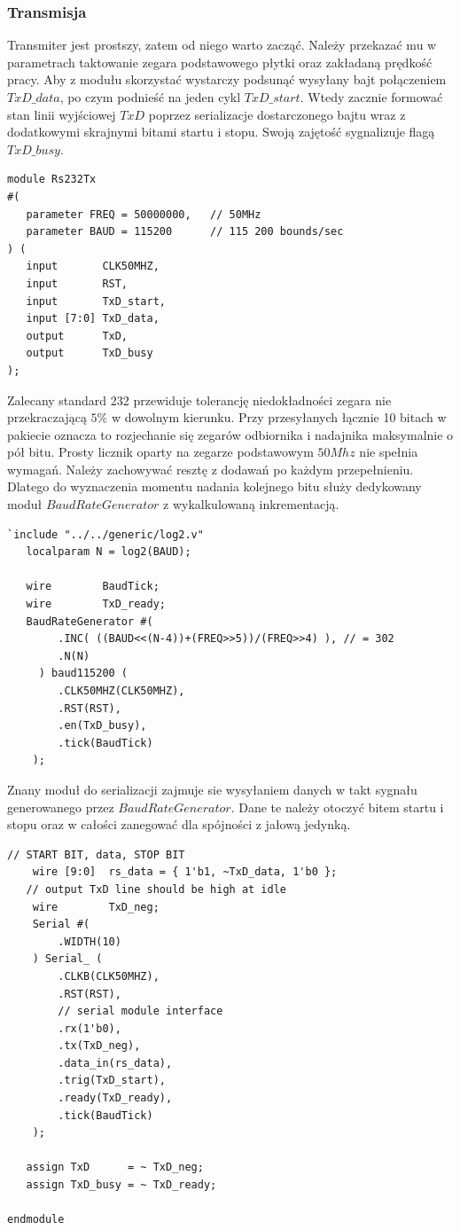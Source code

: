 \documentclass[a4paper,12pt]{article}
\begin{document}
\subsubsection{Transmisja}
Transmiter jest prostszy, zatem od niego warto zacząć. Należy przekazać mu w parametrach taktowanie zegara podstawowego płytki oraz zakładaną prędkość pracy. Aby z modułu skorzystać wystarczy podsunąć wysyłany bajt połączeniem $TxD\_data$, po czym podnieść na jeden cykl $TxD\_start$. Wtedy zacznie formować stan linii wyjściowej $TxD$ poprzez serializacje dostarczonego bajtu wraz z dodatkowymi skrajnymi bitami startu i stopu. Swoją zajętość sygnalizuje flagą $TxD\_busy$.
\begin{lstlisting}[label=Rs232Tx,caption=Rs232Tx.v]
module Rs232Tx
#(
   parameter FREQ = 50000000,   // 50MHz
   parameter BAUD = 115200      // 115 200 bounds/sec
) (
   input       CLK50MHZ,
   input       RST,
   input       TxD_start,
   input [7:0] TxD_data,
   output      TxD,
   output      TxD_busy
);
\end{lstlisting}

Zalecany standard 232 przewiduje tolerancję niedokładności zegara nie przekraczającą $5\%$ w dowolnym kierunku. Przy przesyłanych łącznie 10 bitach w pakiecie oznacza to rozjechanie się zegarów odbiornika i nadajnika maksymalnie o pół bitu. Prosty licznik oparty na zegarze podstawowym $50Mhz$ nie spełnia wymagań. Należy zachowywać resztę z dodawań po każdym przepełnieniu. Dlatego do wyznaczenia momentu nadania kolejnego bitu służy dedykowany moduł $BaudRateGenerator$ z wykalkulowaną inkrementacją.
\begin{lstlisting}[label=Rs232Tx,caption=Rs232Tx.v,firstnumber=14]
   `include "../../generic/log2.v"
   localparam N = log2(BAUD);

   wire        BaudTick;
   wire        TxD_ready;
   BaudRateGenerator #(
        .INC( ((BAUD<<(N-4))+(FREQ>>5))/(FREQ>>4) ), // = 302
        .N(N)
     ) baud115200 (
        .CLK50MHZ(CLK50MHZ),
        .RST(RST),
        .en(TxD_busy),
        .tick(BaudTick)
    );
\end{lstlisting}

Znany moduł do serializacji zajmuje sie wysyłaniem danych w takt sygnału generowanego przez $BaudRateGenerator$. Dane te należy otoczyć bitem startu i stopu oraz w całości zanegować dla spójności z jałową jedynką.
\begin{lstlisting}[label=Rs232Tx,caption=Rs232Tx.v,firstnumber=29]
    // START BIT, data, STOP BIT
    wire [9:0]  rs_data = { 1'b1, ~TxD_data, 1'b0 };
   // output TxD line should be high at idle
    wire        TxD_neg;
    Serial #(
        .WIDTH(10)
    ) Serial_ (
        .CLKB(CLK50MHZ),
        .RST(RST),
        // serial module interface
        .rx(1'b0),
        .tx(TxD_neg),
        .data_in(rs_data),
        .trig(TxD_start),
        .ready(TxD_ready),
        .tick(BaudTick)
    );

   assign TxD      = ~ TxD_neg;
   assign TxD_busy = ~ TxD_ready;

endmodule
\end{lstlisting}
\end{document}
